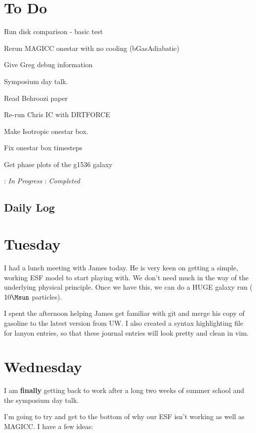 \documentclass[11pt,letterpaper]{article}
\begin{document}
\section{To Do}
\begin{bullets}
\item[\textleaf] Run disk comparison - basic test
\item[\textleaf] Rerun MAGICC onestar with no cooling (bGasAdiabatic)
\item Give Greg debug information
\item[\checkmark] Symposium day talk.
\item Read Behroozi paper
\item[\textleaf] Re-run Chris IC with DRTFORCE
\item[\checkmark] Make Isotropic onestar box.
\item Fix onestar box timesteps
\item Get phase plots of the g1536 galaxy
\end{bullets}

\textleaf : \textit{In Progress} \qquad \checkmark : \textit{Completed}
\subsection{Daily Log}

\section{Tuesday}

I had a lunch meeting with James today. He is very keen on getting a
simple, working ESF model to start playing with. We don't need much in
the way of the underlying physical principle. Once we have this, we can
do a HUGE galaxy run ($10 \Msun$ particles).

I spent the afternoon helping James get familiar with git and merge his
copy of gasoline to the latest version from UW. I also created a syntax
highlighting file for lanyon entries, so that these journal entries will
look pretty and clean in vim.

\section{Wednesday}

I am \textbf{finally} getting back to work after a long two weeks of
summer school and the symposium day talk.

I'm going to try and get to the bottom of why our ESF isn't working as
well as MAGICC. I have a few ideas:
\end{document}
